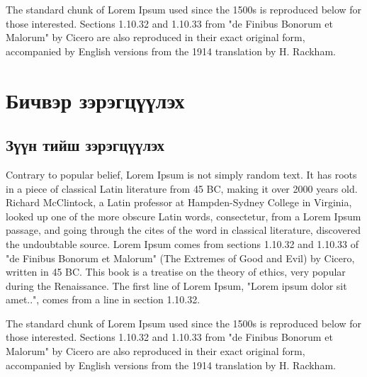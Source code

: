 \documentclass[12pt,A4]{report}
\begin{document}
The standard chunk of Lorem Ipsum used since the 1500s is reproduced below for those interested. Sections 1.10.32 and 1.10.33 from "de Finibus Bonorum et Malorum" by Cicero are also reproduced in their exact original form, accompanied by English versions from the 1914 translation by H. Rackham.

\section{Бичвэр зэрэгцүүлэх}
\subsection{Зүүн тийш зэрэгцүүлэх}
\begin{flushleft}
	Contrary to popular belief, Lorem Ipsum is not simply random text. It has roots in a piece of classical Latin literature from 45 BC, making it over 2000 years old. Richard McClintock, a Latin professor at Hampden-Sydney College in Virginia, looked up one of the more obscure Latin words, consectetur, from a Lorem Ipsum passage, and going through the cites of the word in classical literature, discovered the undoubtable source. Lorem Ipsum comes from sections 1.10.32 and 1.10.33 of "de Finibus Bonorum et Malorum" (The Extremes of Good and Evil) by Cicero, written in 45 BC. This book is a treatise on the theory of ethics, very popular during the Renaissance. The first line of Lorem Ipsum, "Lorem ipsum dolor sit amet..", comes from a line in section 1.10.32.

	The standard chunk of Lorem Ipsum used since the 1500s is reproduced below for those interested. Sections 1.10.32 and 1.10.33 from "de Finibus Bonorum et Malorum" by Cicero are also reproduced in their exact original form, accompanied by English versions from the 1914 translation by H. Rackham.
\end{flushleft}
\end{document}

